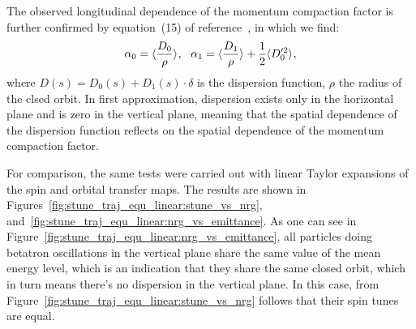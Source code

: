 The observed longitudinal dependence of the momentum compaction factor is further confirmed by equation~(15)
of reference~\cite{Senichev:IPAC13}, in which we find:
\[
\alpha_0 = \avg{\frac{D_0}{\rho}},~~ \alpha_1 = \avg{\frac{D_1}{\rho}} + \frac12\avg{D_0'^2},
\]
where $D(s) = D_0(s) + D_1(s)\cdot \delta$  is the dispersion function, $\rho$ the radius of the clsed orbit.
In first approximation, dispersion exists only in the horizontal plane and is zero in the vertical plane,
meaning that the spatial dependence of the dispersion function reflects on the spatial dependence of the momentum
compaction factor.

For comparison, the same tests were carried out with linear Taylor expansions of the spin and orbital
transfer maps. The results are shown in Figures~\ref{fig:stune_traj_equ_linear:stune_vs_nrg},
and~\ref{fig:stune_traj_equ_linear:nrg_vs_emittance}. As one can see in
Figure~\ref{fig:stune_traj_equ_linear:nrg_vs_emittance}, all particles doing betatron oscillations in the
vertical plane share the same value of the mean energy level, which is an indication that they share
the same closed orbit, which in turn means there's no dispersion in the vertical plane.
In this case, from Figure~\ref{fig:stune_traj_equ_linear:stune_vs_nrg} follows that their spin tunes
are equal.

